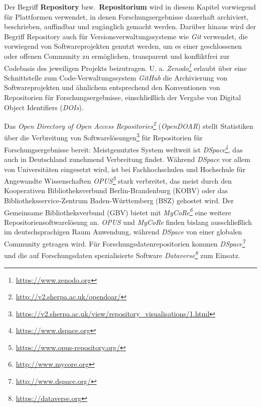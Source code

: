 \documentclass[
  11pt,
  letterpaper,
  DIV=11,
  twoside]{scrreprt}
\DeclareRobustCommand{\href}[2]{#2\footnote{\url{#1}}}
\begin{document}
\begin{tcolorbox}[enhanced jigsaw, leftrule=.75mm, toprule=.15mm, left=2mm, opacityback=0, arc=.35mm, colback=white, breakable, colframe=quarto-callout-important-color-frame, rightrule=.15mm, bottomrule=.15mm]
\begin{minipage}[t]{5.5mm}
\textcolor{quarto-callout-important-color}{\faExclamation}
\end{minipage}%
\begin{minipage}[t]{\textwidth - 5.5mm}

Der Begriff \textbf{Repository} bzw.~\textbf{Repositorium} wird in
diesem Kapitel vorwiegend für Plattformen verwendet, in denen
Forschungsergebnisse dauerhaft archiviert, beschrieben, auffindbar und
zugänglich gemacht werden. Darüber hinaus wird der Begriff Repository
auch für Versionsverwaltungssysteme wie \emph{Git} verwendet, die
vorwiegend von Softwareprojekten genutzt werden, um es einer
geschlossenen oder offenen Community zu ermöglichen, transparent und
konfliktfrei zur Codebasis des jeweiligen Projekts beizutragen. U. a.
\emph{\href{https://www.zenodo.org}{Zenodo}} erlaubt über eine
Schnittstelle zum Code-Verwaltungssystem \emph{GitHub} die Archivierung
von Softwareprojekten und ähnlichem entsprechend den Konventionen von
Repositorien für Forschungsergebnisse, einschließlich der Vergabe von
Digital Object Identifiers (\emph{DOIs}).

\end{minipage}%
\end{tcolorbox}

Das \emph{\href{http://v2.sherpa.ac.uk/opendoar/}{Open Directory of Open
Access Repositories}} (\emph{OpenDOAR}) stellt
\href{https://v2.sherpa.ac.uk/view/repository_visualisations/1.html}{Statistiken
über die Verbreitung von Softwarelösungen} für Repositorien für
Forschungsergebnisse bereit: Meistgenutztes System weltweit ist
\emph{\href{https://www.dspace.org}{DSpace}}, das auch in Deutschland
zunehmend Verbreitung findet. Während \emph{DSpace} vor allem von
Universitäten eingesetzt wird, ist bei Fachhochschulen und Hochschule
für Angewandte Wissenschaften
\emph{\href{https://www.opus-repository.org/}{OPUS}} stark verbreitet,
das meist durch den Kooperativen Bibliotheksverbund Berlin-Brandenburg
(KOBV) oder das Bibliotheksservice-Zentrum Baden-Württemberg (BSZ)
gehostet wird. Der Gemeinsame Bibliotheksverbund (GBV) bietet mit
\emph{\href{http://www.mycore.org}{MyCoRe}} eine weitere
Repositoriensoftwarelösung an. \emph{OPUS} und \emph{MyCoRe} finden
bislang ausschließlich im deutschsprachigen Raum Anwendung, während
\emph{DSpace} von einer globalen Community getragen wird. Für
Forschungsdatenrepositorien kommen
\emph{\href{http://www.dspace.org/}{DSpace}} und die auf Forschungsdaten
spezialisierte Software \emph{\href{https://dataverse.org}{Dataverse}}
zum Einsatz.
\end{document}
